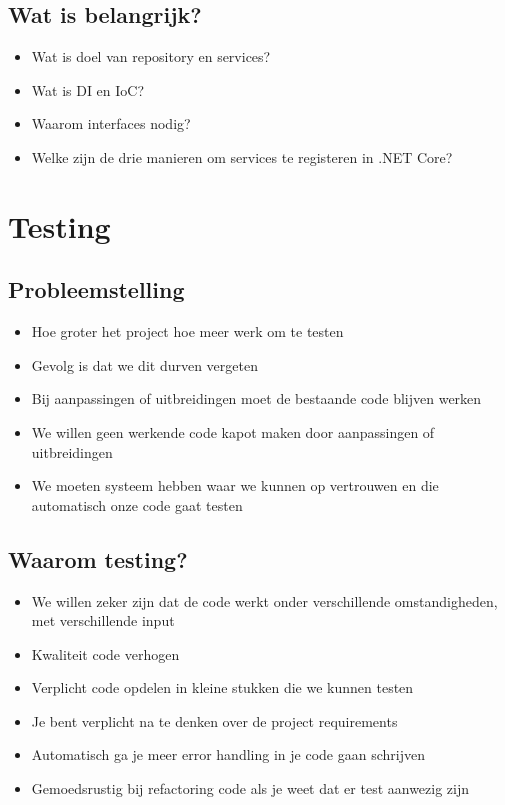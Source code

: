 \documentclass{article}
\begin{document}
\subsection{Wat is belangrijk?}

\begin{itemize}
    \item Wat is doel van repository en services?
    \item Wat is DI en IoC?
    \item Waarom interfaces nodig?
    \item Welke zijn de drie manieren om services te registeren in .NET Core?
\end{itemize}

\section{Testing}

\subsection{Probleemstelling}

\begin{itemize}
    \item Hoe groter het project hoe meer werk om te testen
    \item Gevolg is dat we dit durven vergeten
    \item Bij aanpassingen of uitbreidingen moet de bestaande code blijven werken
    \item We willen geen werkende code kapot maken door aanpassingen of uitbreidingen
    \item We moeten systeem hebben waar we kunnen op vertrouwen en die automatisch onze code gaat testen
\end{itemize}

\subsection{Waarom testing?}

\begin{itemize}
    \item We willen zeker zijn dat de code werkt onder verschillende omstandigheden, met verschillende input
    \item Kwaliteit code verhogen
    \item Verplicht code opdelen in kleine stukken die we kunnen testen
    \item Je bent verplicht na te denken over de project requirements
    \item Automatisch ga je meer error handling in je code gaan schrijven
    \item Gemoedsrustig bij refactoring code als je weet dat er test aanwezig zijn
\end{itemize}
\end{document}
